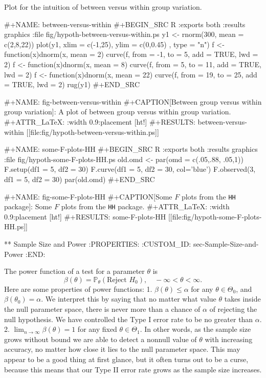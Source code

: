 Plot for the intuition of between versus within group variation.

#+NAME: between-versus-within
#+BEGIN_SRC R :exports both :results graphics :file fig/hypoth-between-versus-within.ps
y1 <- rnorm(300, mean = c(2,8,22))
plot(y1, xlim = c(-1,25), ylim = c(0,0.45) , type = "n")
f <- function(x){dnorm(x, mean = 2)}
curve(f, from = -1, to = 5, add = TRUE, lwd = 2)
f <- function(x){dnorm(x, mean = 8)}
curve(f, from = 5, to = 11, add = TRUE, lwd = 2)
f <- function(x){dnorm(x, mean = 22)}
curve(f, from = 19, to = 25, add = TRUE, lwd = 2)
rug(y1)
#+END_SRC

#+NAME: fig-between-versus-within
#+CAPTION[Between group versus within group variation]: \small A plot of between group versus within group variation.
#+ATTR_LaTeX: :width 0.9\textwidth :placement [ht!]
#+RESULTS: between-versus-within
[[file:fig/hypoth-between-versus-within.ps]]


#+NAME: some-F-plots-HH
#+BEGIN_SRC R :exports both :results graphics :file fig/hypoth-some-F-plots-HH.ps
old.omd <- par(omd = c(.05,.88, .05,1))
F.setup(df1 = 5, df2 = 30)
F.curve(df1 = 5, df2 = 30, col='blue')
F.observed(3, df1 = 5, df2 = 30)
par(old.omd)
#+END_SRC

#+NAME: fig-some-F-plots-HH
#+CAPTION[Some \(F\) plots from the \texttt{HH} package]: \small Some \(F\) plots from the \texttt{HH} package.
#+ATTR_LaTeX: :width 0.9\textwidth :placement [ht!]
#+RESULTS: some-F-plots-HH
[[file:fig/hypoth-some-F-plots-HH.ps]]

** Sample Size and Power
:PROPERTIES:
:CUSTOM_ID: sec-Sample-Size-and-Power
:END:

The power function of a test for a parameter \(\theta\) is
\[
\beta(\theta)=\mathbb{P}_{\theta}(\mbox{Reject }H_{0}),\quad -\infty < \theta < \infty.
\]
Here are some properties of power functions:
1. \(\beta(\theta)\leq\alpha\) for any \(\theta\in\Theta_{0}\), and
   \(\beta(\theta_{0})=\alpha\). We interpret this by saying that no
   matter what value \(\theta\) takes inside the null parameter space,
   there is never more than a chance of \(\alpha\) of rejecting the
   null hypothesis. We have controlled the Type I error rate to be no
   greater than \(\alpha\).
2. \(\lim_{n\to\infty}\beta(\theta)=1\) for any fixed
   \(\theta\in\Theta_{1}\). In other words, as the sample size grows
   without bound we are able to detect a nonnull value of \(\theta\)
   with increasing accuracy, no matter how close it lies to the null
   parameter space. This may appear to be a good thing at first
   glance, but it often turns out to be a curse, because this means
   that our Type II error rate grows as the sample size increases.

